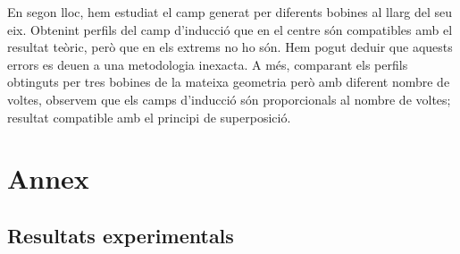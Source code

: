\documentclass[11pt]{article}
\numberwithin{equation}{section}
\numberwithin{figure}{section}
\numberwithin{table}{section}
\begin{document}
En segon lloc, hem estudiat el camp generat per diferents bobines al llarg del seu eix. Obtenint perfils del camp d'inducció que en el centre són compatibles amb el resultat teòric, però que en els extrems no ho són. Hem pogut deduir que aquests errors es deuen a una metodologia inexacta. A més, comparant els perfils obtinguts per tres bobines de la mateixa geometria però amb diferent nombre de voltes, observem que els camps d'inducció són proporcionals al nombre de voltes; resultat compatible amb el principi de superposició.



\newpage

\appendix
\section{Annex}


\subsection{Resultats experimentals}\label{taules_dades_exp}
\end{document}
